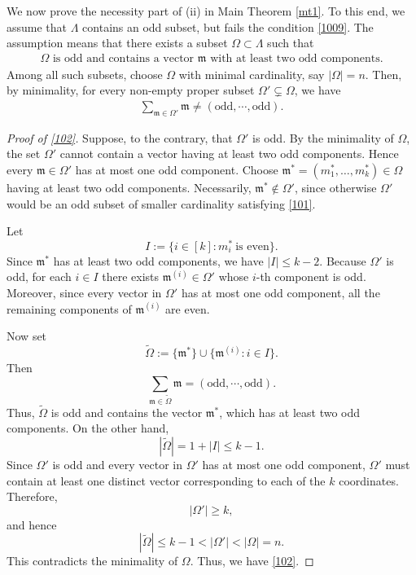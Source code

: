 \documentclass[11 pt,letterpaper]{amsart}
\theoremstyle{plain}
\theoremstyle{definition}
\theoremstyle{remark} \theoremstyle{exam} \theoremstyle{ob}
\numberwithin{equation}{section}
\begin{document}
We now prove the necessity part of (ii) in Main Theorem \ref{mt1}.  
To this end, we assume that 
$\Lambda$ contains an odd subset, but fails the condition \eqref{1009}.
The assumption  means that there exists a subset $\Omega\subset \Lambda$ such that
\begin{align}\label{101}
\text{$\Omega$ is odd and contains a vector $\mathfrak{m}$ with at least two odd components.}
\end{align}
Among all such subsets, choose $\Omega$ with minimal cardinality, say $|\Omega|=n$. Then, by minimality, for every non-empty proper subset $\Omega'\subsetneq \Omega$, we have
\begin{align}\label{102}
\sum_{\mathfrak{m}\in \Omega'} \mathfrak{m} \neq (\text{odd},\cdots,\text{odd}).
\end{align}
\begin{proof}[Proof of \eqref{102}]
Suppose, to the contrary, that
	$\Omega'$ is odd. By the minimality of $\Omega$, the set $\Omega'$ cannot contain a vector
	having at least two odd components. Hence every
	$\mathfrak m\in\Omega'$ has at most one odd component. Choose
	$\mathfrak m^{*}
	=
	(m_1^{*},\ldots,m_k^{*})
	\in\Omega$
	having at least two odd components. Necessarily,
	$\mathfrak m^{*}\notin\Omega'$, since otherwise $\Omega'$ would be an
	odd subset of smaller cardinality satisfying \eqref{101}.
	

	Let
	\[
	I:=\{i\in[k]:m_i^{*}\ \text{is even}\}.
	\]
	Since $\mathfrak m^{*}$ has at least two odd components, we have
	$|I|\leq k-2.$
	Because $\Omega'$ is odd, for each $i\in I$ there exists
	$\mathfrak m^{(i)}\in\Omega'$ whose $i$-th component is odd.
	Moreover, since every vector in $\Omega'$ has at most one odd component,
	all the remaining components of $\mathfrak m^{(i)}$ are even.
	
	
	
	Now set
	\[
	\widetilde{\Omega}
	:=
	\{\mathfrak m^{*}\}
	\cup
	\{\mathfrak m^{(i)}:i\in I\}.
	\]
	Then
	\[
	\sum_{\mathfrak m\in\widetilde{\Omega}}\mathfrak m
	=
	(\text{odd},\cdots,\text{odd}).
	\]
	Thus, $\widetilde{\Omega}$ is odd and contains the vector
	$\mathfrak m^{*}$, which has at least two odd components. On the other
	hand,
	\[
	|\widetilde{\Omega}|
	=
	1+|I|
	\leq k-1.
	\]
	Since $\Omega'$ is odd and every vector in $\Omega'$ has at most one
	odd component, $\Omega'$ must contain at least one distinct vector
	corresponding to each of the $k$ coordinates. Therefore,
	\[
	|\Omega'|\geq k,
	\]
	and hence
	\[
	|\widetilde{\Omega}|
	\leq k-1
	<
	|\Omega'|
	<
	|\Omega|=n.
	\]
	This contradicts the minimality of $\Omega$. Thus, we have \eqref{102}.
\end{proof}
\end{document}
